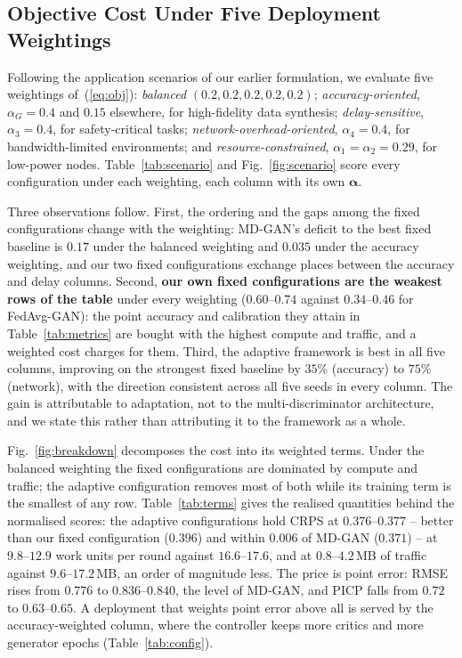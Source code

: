 \documentclass[journal]{IEEEtran}
\newcommand{\valpha}{\boldsymbol{\alpha}}
\begin{document}
\subsection{Objective Cost Under Five Deployment Weightings}
\label{sec:scen}
Following the application scenarios of our earlier formulation, we evaluate
five weightings of~(\ref{eq:obj}): \emph{balanced}
$(0.2,0.2,0.2,0.2,0.2)$; \emph{accuracy-oriented}, $\alpha_G=0.4$ and $0.15$
elsewhere, for high-fidelity data synthesis; \emph{delay-sensitive},
$\alpha_3=0.4$, for safety-critical tasks; \emph{network-overhead-oriented},
$\alpha_4=0.4$, for bandwidth-limited environments; and
\emph{resource-constrained}, $\alpha_1=\alpha_2=0.29$, for low-power nodes.
Table~\ref{tab:scenario} and Fig.~\ref{fig:scenario} score every configuration
under each weighting, each column with its own $\valpha$.

Three observations follow. First, the ordering and the gaps among the fixed
configurations change with the weighting: MD-GAN's deficit to the best fixed
baseline is $0.17$ under the balanced weighting and $0.035$ under the
accuracy weighting, and our two fixed configurations exchange places between
the accuracy and delay columns. Second, \textbf{our own fixed configurations
are the weakest rows of the table} under every weighting ($0.60$--$0.74$
against $0.34$--$0.46$ for FedAvg-GAN): the point accuracy and calibration they
attain in Table~\ref{tab:metrics} are bought with the highest compute and
traffic, and a weighted cost charges for them. Third, the adaptive framework is
best in all five columns, improving on the strongest fixed baseline by $35\%$
(accuracy) to $75\%$ (network), with the direction consistent across all five
seeds in every column. The gain is attributable to adaptation, not to the
multi-discriminator architecture, and we state this rather than attributing it
to the framework as a whole.

Fig.~\ref{fig:breakdown} decomposes the cost into its weighted terms. Under the
balanced weighting the fixed configurations are dominated by compute and
traffic; the adaptive configuration removes most of both while its training
term is the smallest of any row. Table~\ref{tab:terms} gives the realised
quantities behind the normalised scores: the adaptive configurations hold CRPS
at $0.376$--$0.377$ -- better than our fixed configuration ($0.396$) and within
$0.006$ of MD-GAN ($0.371$) -- at $9.8$--$12.9$ work units per round against
$16.6$--$17.6$, and at $0.8$--$4.2$\,MB of traffic against $9.6$--$17.2$\,MB,
an order of magnitude less. The price is point error: RMSE rises from $0.776$
to $0.836$--$0.840$, the level of MD-GAN, and PICP falls from $0.72$ to
$0.63$--$0.65$. A deployment that weights point error above all is served by
the accuracy-weighted column, where the controller keeps more critics and more
generator epochs (Table~\ref{tab:config}).
\end{document}
